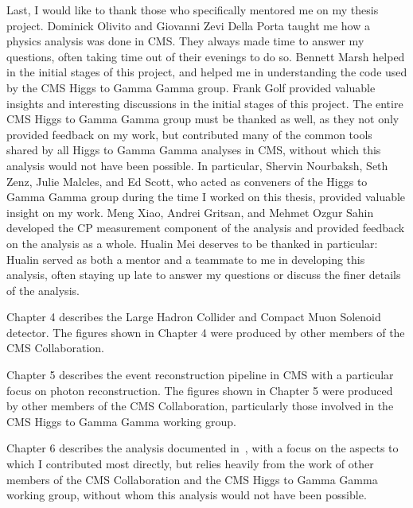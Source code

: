 \begin{frontmatter}
\begin{acknowledgements}
    Last, I would like to thank those who specifically mentored me on my thesis project.
    Dominick Olivito and Giovanni Zevi Della Porta taught me how a physics analysis was done in CMS. They always made time to answer my questions, often taking time out of their evenings to do so.
    Bennett Marsh helped in the initial stages of this project, and helped me in understanding the code used by the CMS Higgs to Gamma Gamma group.
    Frank Golf provided valuable insights and interesting discussions in the initial stages of this project.
    The entire CMS Higgs to Gamma Gamma group must be thanked as well, as they not only provided feedback on my work, but contributed many of the common tools shared by all Higgs to Gamma Gamma analyses in CMS, without which this analysis would not have been possible.
    In particular, Shervin Nourbaksh, Seth Zenz, Julie Malcles, and Ed Scott, who acted as conveners of the Higgs to Gamma Gamma group during the time I worked on this thesis, provided valuable insight on my work.
    Meng Xiao, Andrei Gritsan, and Mehmet Ozgur Sahin developed the CP measurement component of the analysis and provided feedback on the analysis as a whole.
    Hualin Mei deserves to be thanked in particular: Hualin served as both a mentor and a teammate to me in developing this analysis, often staying up late to answer my questions or discuss the finer details of the analysis.

    Chapter 4 describes the Large Hadron Collider and Compact Muon Solenoid detector.
    The figures shown in Chapter 4 were produced by other members of the CMS Collaboration.
    
    Chapter 5 describes the event reconstruction pipeline in CMS with a particular focus on photon reconstruction.
    The figures shown in Chapter 5 were produced by other members of the CMS Collaboration, particularly those involved in the CMS Higgs to Gamma Gamma working group.

    Chapter 6 describes the \ttH analysis documented in~\cite{tth_observation}, with a focus on the aspects to which I contributed most directly, but relies heavily from the work of other members of the CMS Collaboration and the CMS Higgs to Gamma Gamma working group, without whom this analysis would not have been possible.


\end{acknowledgements}
\end{frontmatter}
